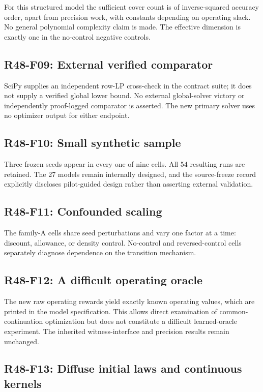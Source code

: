 For this structured model the sufficient cover count is of inverse-squared accuracy order, apart from precision work, with constants depending on operating slack. No general polynomial complexity claim is made. The effective dimension is exactly one in the no-control negative controls.

\subsection{R48-F09: External verified comparator}

SciPy supplies an independent row-LP cross-check in the contract suite; it does not supply a verified global lower bound. No external global-solver victory or independently proof-logged comparator is asserted. The new primary solver uses no optimizer output for either endpoint.

\subsection{R48-F10: Small synthetic sample}

Three frozen seeds appear in every one of nine cells. All 54 resulting runs are retained. The 27 models remain internally designed, and the source-freeze record explicitly discloses pilot-guided design rather than asserting external validation.

\subsection{R48-F11: Confounded scaling}

The family-A cells share seed perturbations and vary one factor at a time: discount, allowance, or density control. No-control and reversed-control cells separately diagnose dependence on the transition mechanism.

\subsection{R48-F12: A difficult operating oracle}

The new raw operating rewards yield exactly known operating values, which are printed in the model specification. This allows direct examination of common-continuation optimization but does not constitute a difficult learned-oracle experiment. The inherited witness-interface and precision results remain unchanged.

\subsection{R48-F13: Diffuse initial laws and continuous kernels}

